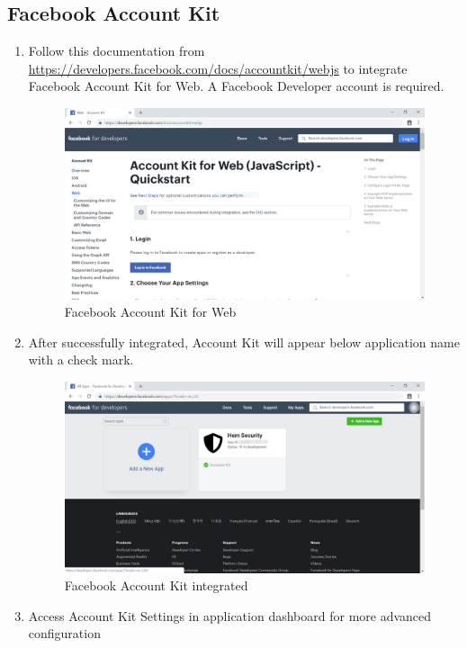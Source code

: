 \tocless\subsection{Facebook Account Kit}
\begin{enumerate}
	\item Follow this documentation from \href{https://developers.facebook.com/docs/accountkit/webjs}{https://developers.facebook.com/docs/accountkit/webjs} to integrate Facebook Account Kit for Web. A Facebook Developer account is required.
	      \begin{center}
	      	\begin{figure}[H]
	      		\centering
	      		\includegraphics[width=0.6\columnwidth]{images/appendixA/Facebook-AccountKit-Docs.PNG}
	      		\caption{Facebook Account Kit for Web}
	      	\end{figure}
	      \end{center}
	\item After successfully integrated, Account Kit will appear below application name with a check mark.
	      \begin{center}
	      	\begin{figure}[H]
	      		\centering
	      		\includegraphics[width=0.6\columnwidth]{images/appendixA/Facebook-AccountKit-Integrated.png}
	      		\caption{Facebook Account Kit integrated}
	      	\end{figure}
	      \end{center}
	\item Access Account Kit Settings in application dashboard for more advanced configuration
	      \begin{center}
	      	\begin{figure}[H]

\end{figure}
\end{center}
\end{enumerate}
